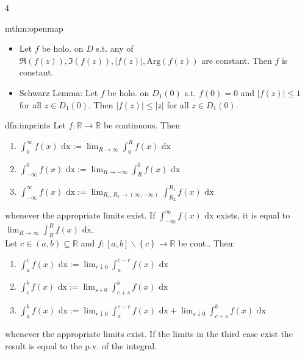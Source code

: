 \documentclass[landscape, 8pt]{extarticle}
\begin{document}
\begin{multicols*}{4}
\begin{mthm}{mthm:openmap}{ }
			\begin{itemize}
				\item Let $f$ be holo. on $D$ s.t. any of $\Re(f(z)), \Im(f(z)), \left|f(z)\right|, \text{Arg}(f(z))$ are constant. Then $f$ is constant.
				\item Schwarz Lemma: Let $f$ be holo. on $D_1(0)$ s.t. $f(0) = 0$ and $\left|f(z)\right| \le 1$ for all $z \in D_1(0)$. Then $\left|f(z)\right| \le \left|z\right|$ for all $z \in D_1(0)$.
			\end{itemize}
			
		\end{mthm}
		
		
		\begin{dfn}{dfn:imprints}{ }
			Let $f: \mathbb{R} \to \mathbb{R}$ be continuous. Then\\
			\begin{enumerate}[label=(\roman*)]
				\item $\int_{0}^{\infty} f(x) \text{ dx} := \lim_{R\to \infty} \int_{0}^{R} f(x) \text{ dx}$
				\item $\int_{-\infty}^{0} f(x) \text{ dx} := \lim_{R\to -\infty} \int_{R}^{0}f(x) \text{ dx}$
				\item $\int_{-\infty}^{\infty} f(x) \text{ dx} := \lim_{R_1, R_2\to (\infty, -\infty)} \int_{R_2}^{R_1}f(x) \text{ dx}$
			\end{enumerate}
			whenever the appropriate limits exist. If $\int_{-\infty}^{\infty} f(x) \text{ dx}$ exists, it is equal to $\lim_{R\to \infty} \int_{R}^{R}f(x) \text{ dx}$.\\
			
			Let $c \in (a, b) \subseteq \mathbb{R}$ and $f: [a, b] \backslash \left\{c\right\} \to \mathbb{R}$ be cont.. Then:
			\begin{enumerate}[label=(\roman*)]
				\item $\int_{a}^{c}f(x) \text{ dx} := \lim_{r \downarrow 0 } \int_{a}^{c-r} f(x) \text{ dx}$
				\item $\int_{c}^{b}f(x) \text{ dx} := \lim_{s \downarrow 0} \int_{c+s}^{b}f(x) \text{ dx}$
				\item $\int_{a}^{b}f(x) \text{ dx} := \lim_{r \downarrow 0 } \int_{a}^{c-r} f(x) \text{ dx} + \lim_{s \downarrow 0} \int_{c+s}^{b}f(x) \text{ dx}$
			\end{enumerate}	
			whenever the appropriate limits exist. If the limits in the third case exist the result is equal to the p.v. of the integral.
			
		\end{dfn}
		

\end{multicols*}
\end{document}
